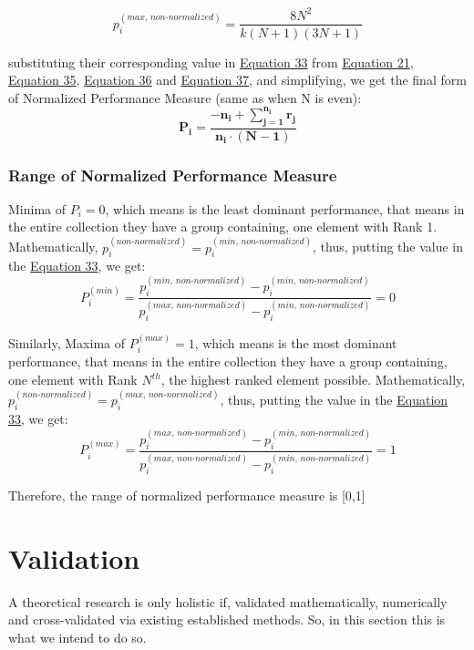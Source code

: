 \documentclass[a4paper,fleqn,review]{cas-sc}
\begin{document}
\begin{equation}
	\label{eq:maxima-odd}
	p_i^{(max, \, non\text{-}normalized)} = \frac{8N^2}{k (N+1)(3N+1)}
\end{equation}

substituting their corresponding value in \hyperref[eq:normalized-simpler]{Equation 33} from \hyperref[p-non-normalized]{Equation 21},  
\hyperref[eq:even-SUDH-odd]{Equation 35}, \hyperref[eq:minima-odd]{Equation 36} and \hyperref[eq:maxima-odd]{Equation 37}, and simplifying, we get the final form of Normalized Performance Measure (same as when N is even):
\begin{equation}
	\boxed{
		\mathbf{
			P_i = \frac{-n_i +  \sum\limits_{j=1}^{n_i} r_j}{n_i \cdot (N - 1)}}
	}
\end{equation}


\subsubsection{Range of Normalized Performance Measure}
Minima of $P_i = 0$, which means is the least dominant performance, that means in the entire collection they have a group containing, one element with Rank 1. Mathematically, $p_i^{(non\text{-}normalized)} =  p_i^{(min, \, non\text{-}normalized)}$, thus, putting the value in the \hyperref[eq:normalized-simpler]{Equation 33}, we get:
\begin{equation}
	P_i^{(min)} = \frac{p_i^{(min, \, non\text{-}normalized)} - p_i^{(min, \, non\text{-}normalized)}}{p_i^{(max, \, non\text{-}normalized)} - p_i^{(min, \, non\text{-}normalized)}} = 0
\end{equation}

Similarly,
Maxima of $P_i^{(max)} = 1$, which means is the most dominant performance, that means in the entire collection they have a group containing, one element with Rank $N^{th}$, the highest ranked element possible. Mathematically, $p_i^{(non\text{-}normalized)} =  p_i^{(max, \, non\text{-}normalized)}$, thus, putting the value in the \hyperref[eq:normalized-simpler]{Equation 33}, we get:
\begin{equation}
	P_i^{(max)} = \frac{p_i^{(max, \, non\text{-}normalized)} - p_i^{(min, \, non\text{-}normalized)}}{p_i^{(max, \, non\text{-}normalized)} - p_i^{(min, \, non\text{-}normalized)}} = 1
\end{equation}

Therefore, the range of normalized performance measure is [0,1]


\section{Validation}
A theoretical research is only holistic if, validated mathematically, numerically and cross-validated via existing established methods. So, in this section this is what we intend to do so.
\end{document}
